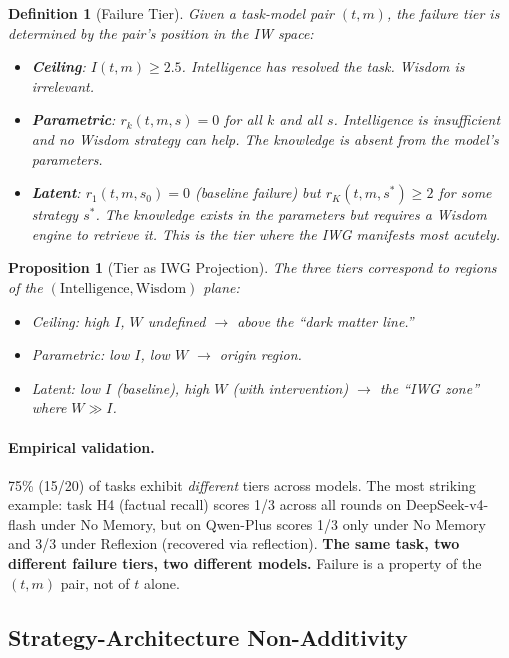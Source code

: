 \documentclass{article}
\newtheorem{definition}{Definition}
\newtheorem{proposition}{Proposition}
\begin{document}
\begin{definition}[Failure Tier]
\label{def:tier}
Given a task-model pair $(t, m)$, the \emph{failure tier} is determined
by the pair's position in the IW space:
\begin{itemize}[nosep]
  \item \textbf{Ceiling}: $I(t, m) \geq 2.5$. Intelligence has resolved
    the task. Wisdom is irrelevant.
  \item \textbf{Parametric}: $r_k(t, m, s) = 0$ for all $k$ and all $s$.
    Intelligence is insufficient \emph{and} no Wisdom strategy can help.
    The knowledge is absent from the model's parameters.
  \item \textbf{Latent}: $r_1(t, m, s_0) = 0$ (baseline failure) but
    $r_K(t, m, s^*) \geq 2$ for some strategy $s^*$. The knowledge
    exists in the parameters but requires a Wisdom engine to
    \emph{retrieve} it. This is the tier where the IWG manifests
    most acutely.
\end{itemize}
\end{definition}

\begin{proposition}[Tier as IWG Projection]
\label{prop:tier}
The three tiers correspond to regions of the
$(\text{Intelligence}, \text{Wisdom})$ plane:
\begin{itemize}[nosep]
  \item Ceiling: high $I$, $W$ undefined $\to$ above the ``dark matter
    line.''
  \item Parametric: low $I$, low $W$ $\to$ origin region.
  \item Latent: low $I$ (baseline), high $W$ (with intervention)
    $\to$ the ``IWG zone'' where $W \gg I$.
\end{itemize}
\end{proposition}

\paragraph{Empirical validation.}
75\% (15/20) of tasks exhibit \emph{different} tiers across models. The
most striking example: task H4 (factual recall) scores 1/3 across all
rounds on DeepSeek-v4-flash under No Memory, but on Qwen-Plus scores
1/3 only under No Memory and 3/3 under Reflexion (recovered via
reflection). \textbf{The same task, two different failure tiers, two
different models.} Failure is a property of the $(t, m)$ pair,
not of $t$ alone.


\subsection{Strategy-Architecture Non-Additivity}
\end{document}
